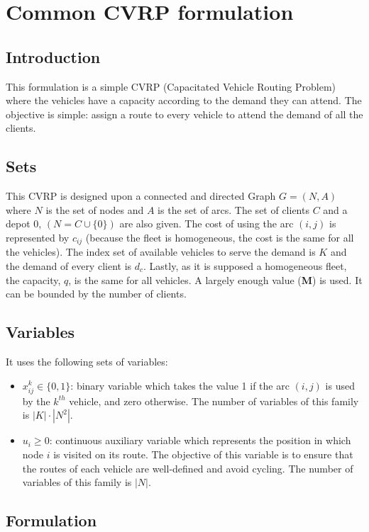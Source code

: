 \documentclass[preprint,review,12pt]{elsarticle}
\begin{document}
\section{Common CVRP formulation}

\subsection{Introduction}
This formulation is a simple CVRP (Capacitated Vehicle Routing Problem) where the vehicles have a capacity according to the demand they can attend. The objective is simple: assign a route to every vehicle to attend the demand of all the clients.

\subsection{Sets}
This CVRP is designed upon a connected and directed Graph $G = (N,A)$ where $N$ is the set of nodes and $A$ is the set of arcs. The set of clients $C$ and a depot $0$, $(N=C \cup \{0\})$ are also given. The cost of using the arc $(i,j)$ is represented by $c_{ij}$ (because the fleet is homogeneous, the cost is the same for all the vehicles). The index set of available vehicles to serve the demand is $K$ and the demand of every client is $d_c$. Lastly, as it is supposed a homogeneous fleet, the capacity, $q$, is the same for all vehicles. A largely enough value (\textbf{M}) is used. It can be bounded by the number of clients.

\subsection{Variables}
It uses the following sets of variables:

\begin{itemize}
	\item  $x_{ij}^{k}  \in  \{ 0,1 \}$: binary variable which takes the value 1 if the arc $(i,j)$ is used by the $k^{th}$ vehicle, and zero otherwise. The number of variables of this family is $|K|\cdot|N^2|$.
	\item $u_i \geq 0$: continuous auxiliary variable which represents the position in which node $i$ is visited on its route. The objective of this variable is to ensure that the routes of each vehicle are well-defined and avoid cycling. The number of variables of this family is $|N|$.
\end{itemize}

\subsection{Formulation}
\end{document}
